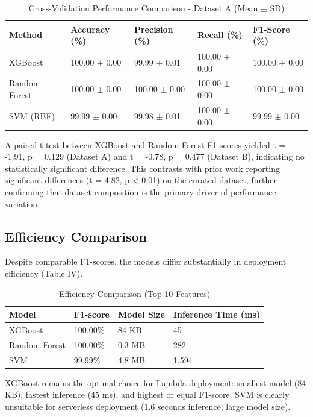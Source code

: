 \documentclass[conference]{IEEEtran}
\begin{document}
\begin{table}[!ht]
\centering
\caption{Cross-Validation Performance Comparison - Dataset A (Mean $\pm$ SD)}
\footnotesize
\setlength{\tabcolsep}{3pt}
\begin{tabulary}{\textwidth}{|l|L|L|L|L|}
\hline
\textbf{Method} & \textbf{Accuracy (\%)} & \textbf{Precision (\%)} & \textbf{Recall (\%)} & \textbf{F1-Score (\%)} \\
\hline
XGBoost & 100.00 $\pm$ 0.00 & 99.99 $\pm$ 0.01 & 100.00 $\pm$ 0.00 & 100.00 $\pm$ 0.00 \\
Random Forest & 100.00 $\pm$ 0.00 & 100.00 $\pm$ 0.00 & 100.00 $\pm$ 0.00 & 100.00 $\pm$ 0.00 \\
SVM (RBF) & 99.99 $\pm$ 0.00 & 99.98 $\pm$ 0.01 & 100.00 $\pm$ 0.00 & 99.99 $\pm$ 0.00 \\
\hline
\end{tabulary}
\end{table}

A paired t-test between XGBoost and Random Forest F1-scores yielded t = -1.91, p = 0.129 (Dataset A) and t = -0.78, p = 0.477 (Dataset B), indicating no statistically significant difference. This contrasts with prior work reporting significant differences (t = 4.82, p < 0.01) on the curated dataset, further confirming that dataset composition is the primary driver of performance variation.

\subsection{Efficiency Comparison}

Despite comparable F1-scores, the models differ substantially in deployment efficiency (Table IV).

\begin{table}[!ht]
\centering
\caption{Efficiency Comparison (Top-10 Features)}
\footnotesize
\setlength{\tabcolsep}{3pt}
\begin{tabulary}{\linewidth}{|l|L|L|L|}
\hline
\textbf{Model} & \textbf{F1-score} & \textbf{Model Size} & \textbf{Inference Time (ms)} \\
\hline
XGBoost & 100.00\% & 84 KB & 45 \\
Random Forest & 100.00\% & 0.3 MB & 282 \\
SVM & 99.99\% & 4.8 MB & 1,594 \\
\hline
\end{tabulary}
\end{table}

XGBoost remains the optimal choice for Lambda deployment: smallest model (84 KB), fastest inference (45 ms), and highest or equal F1-score. SVM is clearly unsuitable for serverless deployment (1.6 seconds inference, large model size).
\end{document}
